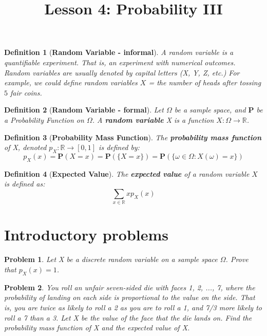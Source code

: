 \documentclass[a4paper,12pt]{article}
\title{Lesson 4: Probability III}
\theoremstyle{perfect}
\newtheorem{dfn}{Definition}
\newtheorem{prb}{Problem}
\newcommand{\R}{\mathbb{R}}
\newcommand{\PP}{\mathbf{P}}
\begin{document}
 
\maketitle


\begin{dfn}[\textbf{Random Variable - informal}]
A random variable is a quantifiable experiment. That
is, an experiment with numerical outcomes. 
Random variables are usually denoted by capital letters (X, Y, Z, etc.)
For example, we could define random variables $X$ = the number of heads
after tossing $5$ fair coins.
\end{dfn}


\begin{dfn}[\textbf{Random Variable - formal}]
Let $\Omega$ be a sample space, and $\PP$ be a Probability Function on $\Omega$. A \textbf{random variable} X is a function $X : \Omega \to \R$.
\end{dfn}


\begin{dfn}[\textbf{Probability Mass Function}]
The \textbf{probability mass function} of X, denoted $p_X : \R \to [0, 1]$ is defined by:
$$p_X(x) = \PP(X = x) = \PP(\{X = x\}) = \PP(\{\omega \in \Omega: X(\omega) = x\})$$
\end{dfn}

\begin{dfn}[\textbf{Expected Value}]
The \textbf{expected value} of a random variable $X$ is defined as:
$$\sum_{x \in \R} x p_X(x)$$
\end{dfn}



\section{Introductory problems}


\begin{prb}
Let X be a discrete random variable on a sample space $\Omega$. Prove that $p_X(x) = 1$.
\end{prb}

\begin{prb}
You roll an unfair seven-sided die with faces 1, 2, ..., 7, where the probability of landing on each side is proportional to the value on the side. That is, you are twice as likely to roll a 2 as you are to roll a 1, and 7/3 more likely to roll a 7 than a 3. Let X be the value of the face that the die lands on. Find the probability mass function of X and the expected value of X.
\end{prb}
\end{document}
